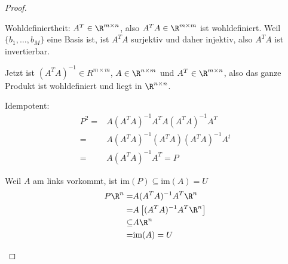 \begin{proof}
	\begin{parts}
	\item Wohldefiniertheit: $A^ T\in \R^{m\times n}$, also $A^TA\in \R^{m\times m}$ ist wohldefiniert. Weil $\{b_1,\dots, b_M\} $ eine Basis ist, ist $A^TA$ surjektiv und daher injektiv, also $A^TA$ ist invertierbar.

		Jetzt ist $(A^TA)^{-1}\in R^{m\times m}$, $A\in \R^{n\times m}$ und $A^T\in \R^{m\times n}$, also das ganze Produkt ist wohldefiniert und liegt in $\R^{n\times n}$.

		Idempotent:
		\begin{align*}
			P^2=&A(A^TA)^{-1}A^TA(A^TA)^{-1}A^T\\
			=&A(A^TA)^{-1}(A^TA)(A^TA)^{-1}A^t\\
			=&A(A^TA)^{-1}A^T=P
		\end{align*}

		Weil $A$ am links vorkommt, ist $\text{im}(P)\subseteq \text{im}(A)=U$
		 \begin{align*}
			 P\R^n=&A(A^TA)^{-1}A^T\R^n\\
			 =&A\left[ (A^TA)^{-1}A^T\R^n \right] \\
			 \subseteq& A\R^n\\
			 =&\text{im}(A)=U
		\end{align*}


\end{parts}
\end{proof}
